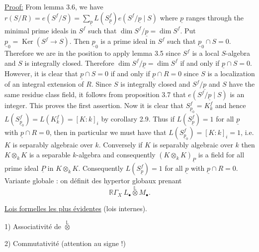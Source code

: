 \uline{Proof:} From lemma 3.6, we have $r(S/R)=e(S^f/S)=\sum_{\underline p}L(S_{\underline p}^f)e(S^f/\underline p\mid S)$ where $\underline p$ ranges through the minimal prime ideals in $S^f$ such that $\dim S^f/\underline p=\dim S^f$. Put $\underline p_0=\operatorname{Ker}(S^f\longrightarrow S)$. Then $\underline p_0$ is a prime ideal in $S^f$ such that $\underline p_0\cap S=0$. Therefore we are in the position to apply lemma 3.5 since $S^f$ is a local $S$-algebra and $S$ is integrally closed. Therefore $\dim S^f/\underline p=\dim S^f$ if and only if $\underline p\cap S=0$. However, it is clear that $\underline p\cap S=0$ if and only if $\underline p\cap R=0$ since $S$ is a localization of an integral extension of $R$. Since $S$ is integrally closed and $S^f/\underline p$ and $S$ have the same residue class field, it follows from proposition 3.7 that $e(S^f/\underline p\mid S)$ is an integer. This proves the first assertion. Now it is clear that $S_{\underline p_0}^f=K_k^f$ and hence $L(S_{\underline p_0}^f)=L(K_k^f)=[K:k]_i$ by corollary 2.9. Thus if $L(S_{\underline p}^f)=1$ for all $\underline p$ with $\underline p\cap R=0$, then in particular we must have that $L(S_{\underline p_0}^f)=[K:k]_i=1$, i.e. $K$ is separably algebraic over $k$. Conversely if $K$ is separably algebraic over $k$ then $K\otimes_k K$ is a separable $k$-algebra and consequently $(K\otimes_k K)_{\underline P}$ is a field for all prime ideal $\underline P$ in $K\otimes_k K$. Consequently $L(S_{\underline p}^f)=1$ for all $\underline p$ with $\underline p\cap R=0$.
Variante globale : on définit des hypertor globaux  prenant
\[
\mathbb R\Gamma_X\ L_\bullet\overset{\mathbb L}{\otimes}M_\bullet.
\]

\uline{Lois formelles les plus évidentes} (lois internes).

1) Associativité de $\overset{\mathbb L}{\otimes}$

2) Commutativité (attention au signe !)

